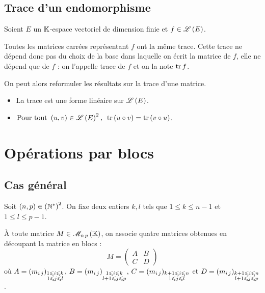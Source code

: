 \subsection{Trace d'un endomorphisme}

\begin{prop}
Soient \(E\) un \(\mathbb{K}\)-espace vectoriel de dimension finie et \(f\in\mathscr{L}\left(E\right)\).

Toutes les matrices carrées représentant \(f\) ont la même trace. Cette trace ne dépend donc pas du choix de la base dans laquelle on écrit la matrice de \(f\), elle ne dépend que de \(f\) : on l'appelle trace de \(f\) et on la note \(\operatorname{tr} f\).
\end{prop}

On peut alors reformuler les résultats sur la trace d'une matrice.

\begin{prop}
\begin{itemize}
    \item La trace est une forme linéaire sur \(\mathscr{L}\left(E\right)\). \\
    \item \(\quantifs{\Tpt\paren{u,v}\in\Lendo{E}^2}\tr\paren{u\rond v}=\tr\paren{v\rond u}\).
\end{itemize}
\end{prop}

\section{Opérations par blocs}

\subsection{Cas général}

Soit \(\left(n,p\right)\in\left(\mathbb{N}^*\right)^2\). On fixe deux entiers \(k,l\) tels que \(1\leq k\leq n-1\) et \(1\leq l\leq p-1\).

À toute matrice \(M\in\M{n\,p}\), on associe quatre matrices obtenues en découpant la matrice en blocs : \[M=\begin{pmatrix}
A & B \\
C & D
\end{pmatrix}\] où \(A=\left(m_{i\,j}\right)_{\substack{1\leqslant i\leqslant k \\ 1\leqslant j\leqslant l}}\), \(B=\left(m_{i\,j}\right)_{\substack{1\leqslant i\leqslant k \\ l+1\leqslant j\leqslant p}}\), \(C=\left(m_{i\,j}\right)_{\substack{k+1\leqslant i\leqslant n \\ 1\leqslant j\leqslant l}}\) et \(D=\left(m_{i\,j}\right)_{\substack{k+1\leqslant i\leqslant n \\ l+1\leqslant j\leqslant p}}\).

